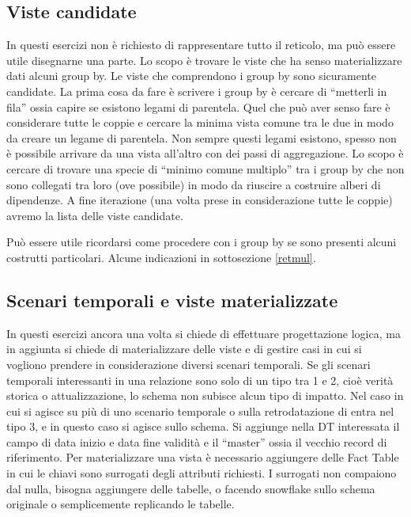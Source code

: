 \subsection{Viste candidate}
In questi esercizi non è richiesto di rappresentare tutto il reticolo, ma può essere utile disegnarne una parte.  Lo scopo è trovare le viste che ha senso materializzare dati alcuni group by. Le viste che comprendono i group by sono sicuramente candidate. La prima cosa da fare è scrivere i group by è cercare di “metterli in fila” ossia capire se esistono legami di parentela.\newline
Quel che può aver senso fare è considerare tutte le coppie e cercare la minima vista comune tra le due in modo da creare un legame di parentela. Non sempre questi legami esistono, spesso non è possibile arrivare da una vista all’altro con dei passi di aggregazione. Lo scopo è cercare di trovare una specie di “minimo comune multiplo” tra i group by che non sono collegati tra loro (ove possibile) in modo da riuscire a costruire alberi di dipendenze. A fine iterazione (una volta prese in considerazione tutte le coppie) avremo la lista delle viste candidate.
\begin{warn}
	Può essere utile ricordarsi come procedere con i group by se sono presenti alcuni costrutti particolari. Alcune indicazioni in sottosezione \ref{retmul}.
\end{warn}
\subsection{Scenari temporali e viste materializzate}
In questi esercizi ancora una volta si chiede di effettuare progettazione logica, ma in aggiunta si chiede di materializzare delle viste e di gestire casi in cui si vogliono prendere in considerazione diversi scenari temporali. Se gli scenari temporali interessanti in una relazione sono solo di un tipo tra 1 e 2, cioè verità storica o attualizzazione, lo schema non subisce alcun tipo di impatto. Nel caso in cui si agisce su più di uno scenario temporale o sulla retrodatazione di entra nel tipo 3, e in questo caso si agisce sullo schema. Si aggiunge nella DT interessata il campo di data inizio e data fine validità e il “master” ossia il vecchio record di riferimento. Per materializzare una vista è necessario aggiungere delle Fact Table in cui le chiavi sono surrogati degli attributi richiesti. I surrogati non compaiono dal nulla, bisogna aggiungere delle tabelle, o facendo snowflake sullo schema originale o semplicemente replicando le tabelle.
\newpage
